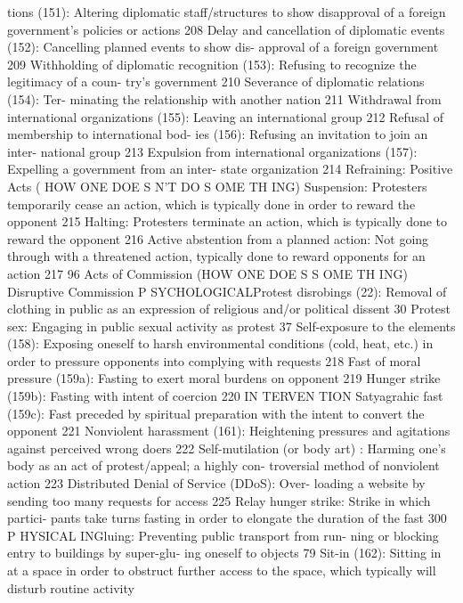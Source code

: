 \documentclass[twoside,a4paper,12pt,fleqn,openany]{extbook}
\begin{document}
tions (151): Altering diplomatic staff/structures
to show disapproval of a foreign government’s
policies or actions
 208
Delay and cancellation of diplomatic events
(152): Cancelling planned events to show dis-
approval of a foreign government
 209
Withholding of diplomatic recognition (153):
Refusing to recognize the legitimacy of a coun-
try’s government
 210
Severance of diplomatic relations (154): Ter-
minating the relationship with another nation		
211
Withdrawal from international organizations
(155): Leaving an international group
 212
Refusal of membership to international bod-
ies (156): Refusing an invitation to join an inter-
national group
 213
Expulsion from international organizations
(157): Expelling a government from an inter-
state organization
 214
Refraining: Positive Acts
( HOW ONE DOE S N’T DO S OME TH ING)
Suspension: Protesters temporarily cease an
action, which is typically done in order to
reward the opponent
 215
Halting: Protesters terminate an action, which
is typically done to reward the opponent 216
Active abstention from a planned action:
Not going through with a threatened action,
typically done to reward opponents for an
action
 217
96
Acts of Commission
(HOW ONE DOE S S OME TH ING)
Disruptive Commission
P SYCHOLOGICALProtest disrobings (22): Removal of clothing
in public as an expression of religious and/or
political dissent
 30
Protest sex: Engaging in public sexual activity
as protest
 37
Self-exposure to the elements (158): Exposing
oneself to harsh environmental conditions
(cold, heat, etc.) in order to pressure opponents
into complying with requests
 218
Fast of moral pressure (159a): Fasting to exert
moral burdens on opponent
 219
Hunger strike (159b): Fasting with intent of
coercion
 220
IN TERVEN TION
Satyagrahic fast (159c): Fast preceded by
spiritual preparation with the intent to convert
the opponent
 221
Nonviolent harassment (161): Heightening
pressures and agitations against perceived
wrong doers
 222
Self-mutilation (or body art) : Harming one’s
body as an act of protest/appeal; a highly con-
troversial method of nonviolent action
 223
Distributed Denial of Service (DDoS): Over-
loading a website by sending too many requests
for access
 225
Relay hunger strike: Strike in which partici-
pants take turns fasting in order to elongate
the duration of the fast
 300
P HYSICAL INGluing: Preventing public transport from run-
ning or blocking entry to buildings by super-glu-
ing oneself to objects
 79
Sit-in (162): Sitting in at a space in order to
obstruct further access to the space, which
typically will disturb routine activity
\end{document}
